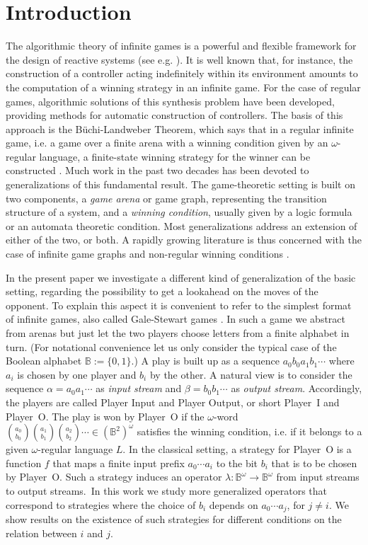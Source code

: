 \documentclass[fleqn,envcountsame]{LMCS}
\newcommand{\pI}{Player~I\xspace}
\newcommand{\pO}{Player~O\xspace}
\newcommand{\B}{\ensuremath{\mathbb{B}}\xspace}
\newcommand{\Bom}{\ensuremath{\mathbb{B}^{\omega}}\xspace}
\newcommand{\Bsqom}{\ensuremath{(\mathbb{B}^2)^{\omega}}\xspace}
\newcommand{\al}{\ensuremath{\alpha}\xspace}
\newcommand{\ie}{i.e.\xspace}
\let\obinom\binom
\renewcommand\binom[2]{
  \Big( { {{#1}} \atop {{#2}} } \Big)
}
\begin{document}
\section{Introduction}\label{sec:introduction}
The algorithmic theory of infinite games is a powerful and flexible framework
for the design of reactive systems (see e.g. \cite{GTW02AutLogInfGam}).
It is well known that, for instance, the
construction of a controller acting indefinitely within its
environment amounts to the computation of a winning strategy in an
infinite game. For the case of regular games, algorithmic solutions
of this synthesis problem have been developed, providing methods for
automatic construction of controllers. The basis of this approach is
the B\"uchi-Landweber Theorem, which says that in a regular infinite
game, \ie a game over a finite arena with a winning condition given by
an $\omega$-regular language, a finite-state winning strategy for the
winner can be constructed \cite{BL69SolSeqCondFinStateStr}.
Much work in the past two decades has been devoted to generalizations of
this fundamental result. The game-theoretic setting is built on
two components, a \emph{game arena} or game graph, representing the
transition structure of a system, and a \emph{winning condition},
usually given by a logic formula or an automata theoretic condition.
Most generalizations address an extension of either of the two, or both.
A rapidly growing literature is thus concerned with the case of infinite game
graphs and non-regular winning conditions \cite{Wal96PushProc,Cach03HighOrdPushAutCaucalHier,BSW03PushGamUnboundRegCond}.

In the present paper we investigate a different kind of generalization of
the basic setting, regarding the possibility to get a lookahead on the moves
of the opponent. To explain this aspect it is convenient to refer to
the simplest format of infinite games, also called Gale-Stewart
games \cite{Mosch80DST}.
In such a game we abstract from arenas but just let the two players choose
letters from a finite alphabet in turn. (For notational convenience let us
only consider the typical case of the Boolean alphabet $\B:=\{0,1\}$.)
A play is built up as a sequence $a_0b_0a_1b_1\cdots$ where
$a_i$ is chosen by one player and $b_i$ by the other.
A natural view is to consider the sequence
$\al=a_0a_1\cdots$ as \emph{input stream} and $\beta=b_0b_1\cdots$ as
\emph{output stream}. Accordingly, the players are called
Player Input and Player Output, or short \pI and \pO.
The play is won by \pO if the $\omega$-word
$\obinom{a_0}{b_0}\obinom{a_1}{b_1}\obinom{a_2}{b_2}\cdots\in\Bsqom$
satisfies the winning condition, \ie if it belongs to a given $\omega$-regular
language $L$. In the classical setting, a strategy for \pO is
a function $f$ that maps a finite input prefix $a_0\cdots a_i$ to
the bit $b_i$ that is to be chosen by \pO. Such a strategy induces an operator
$\lambda:\Bom\to\Bom$ from input streams to output streams.~In this
work we study more generalized operators that correspond to strategies
where the choice of $b_i$ depends on $a_0\cdots a_j$, for $j\neq i$.
We show results on the existence of such strategies
for different conditions on the relation between $i$ and $j$.
\end{document}
